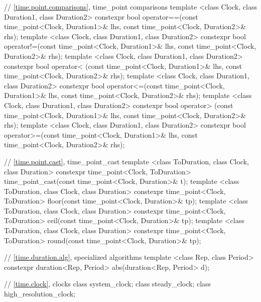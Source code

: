 \begin{codeblock}
{{    // \ref{time.point.comparisons}, time_point comparisons
    template <class Clock, class Duration1, class Duration2>
       constexpr bool operator==(const time_point<Clock, Duration1>& lhs,
                                 const time_point<Clock, Duration2>& rhs);
    template <class Clock, class Duration1, class Duration2>
       constexpr bool operator!=(const time_point<Clock, Duration1>& lhs,
                                 const time_point<Clock, Duration2>& rhs);
    template <class Clock, class Duration1, class Duration2>
       constexpr bool operator< (const time_point<Clock, Duration1>& lhs,
                                 const time_point<Clock, Duration2>& rhs);
    template <class Clock, class Duration1, class Duration2>
       constexpr bool operator<=(const time_point<Clock, Duration1>& lhs,
                                 const time_point<Clock, Duration2>& rhs);
    template <class Clock, class Duration1, class Duration2>
       constexpr bool operator> (const time_point<Clock, Duration1>& lhs,
                                 const time_point<Clock, Duration2>& rhs);
    template <class Clock, class Duration1, class Duration2>
       constexpr bool operator>=(const time_point<Clock, Duration1>& lhs,
                                 const time_point<Clock, Duration2>& rhs);

    // \ref{time.point.cast}, time_point_cast
    template <class ToDuration, class Clock, class Duration>
      constexpr time_point<Clock, ToDuration>
      time_point_cast(const time_point<Clock, Duration>& t);
    template <class ToDuration, class Clock, class Duration>
      constexpr time_point<Clock, ToDuration>
      floor(const time_point<Clock, Duration>& tp);
    template <class ToDuration, class Clock, class Duration>
      constexpr time_point<Clock, ToDuration>
      ceil(const time_point<Clock, Duration>& tp);
    template <class ToDuration, class Clock, class Duration>
      constexpr time_point<Clock, ToDuration>
      round(const time_point<Clock, Duration>& tp);

    // \ref{time.duration.alg}, specialized algorithms
    template <class Rep, class Period>
      constexpr duration<Rep, Period> abs(duration<Rep, Period> d);

    // \ref{time.clock}, clocks
    class system_clock;
    class steady_clock;
    class high_resolution_clock;
  }

}
\end{codeblock}

